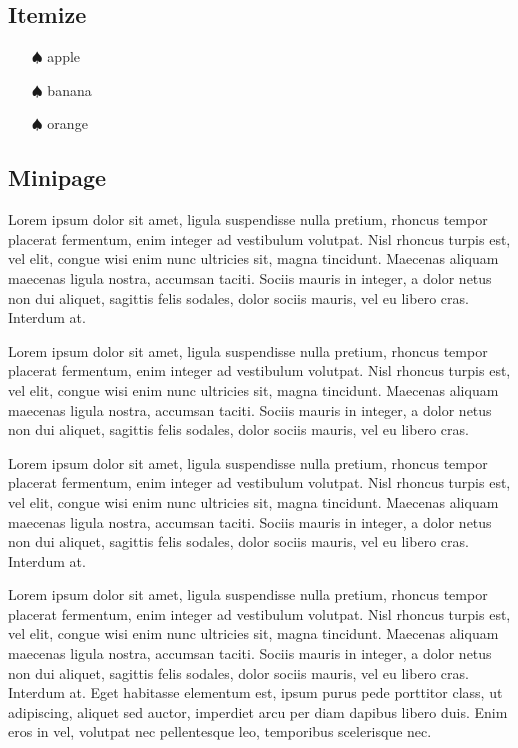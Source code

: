 \documentclass{article}[12pt]
\begin{document}
	\subsection{Itemize}
		\begin{itemize}
			\item[$\spadesuit$] apple
			\item[$\spadesuit$] banana
			\item[$\spadesuit$] orange
		\end{itemize}

	\newpage
	\subsection{Minipage}
		\begin{minipage}{0.3\linewidth}
			Lorem ipsum dolor sit amet, ligula suspendisse nulla pretium, rhoncus tempor placerat fermentum, enim integer ad vestibulum volutpat. Nisl rhoncus turpis est, vel elit, congue wisi enim nunc ultricies sit, magna tincidunt. Maecenas aliquam maecenas ligula nostra, accumsan taciti. Sociis mauris in integer, a dolor netus non dui aliquet, sagittis felis sodales, dolor sociis mauris, vel eu libero cras. Interdum at. 
		\end{minipage}
		\hfill
		\begin{minipage}{0.3\linewidth}
			Lorem ipsum dolor sit amet, ligula suspendisse nulla pretium, rhoncus tempor placerat fermentum, enim integer ad vestibulum volutpat. Nisl rhoncus turpis est, vel elit, congue wisi enim nunc ultricies sit, magna tincidunt. Maecenas aliquam maecenas ligula nostra, accumsan taciti. Sociis mauris in integer, a dolor netus non dui aliquet, sagittis felis sodales, dolor sociis mauris, vel eu libero cras. 
		\end{minipage}
		\hfill
		\begin{minipage}{0.3\linewidth}
			Lorem ipsum dolor sit amet, ligula suspendisse nulla pretium, rhoncus tempor placerat fermentum, enim integer ad vestibulum volutpat. Nisl rhoncus turpis est, vel elit, congue wisi enim nunc ultricies sit, magna tincidunt. Maecenas aliquam maecenas ligula nostra, accumsan taciti. Sociis mauris in integer, a dolor netus non dui aliquet, sagittis felis sodales, dolor sociis mauris, vel eu libero cras. Interdum at. 
		\end{minipage}
		\vfill
		\begin{minipage}{0.3\linewidth}
			Lorem ipsum dolor sit amet, ligula suspendisse nulla pretium, rhoncus tempor placerat fermentum, enim integer ad vestibulum volutpat. Nisl rhoncus turpis est, vel elit, congue wisi enim nunc ultricies sit, magna tincidunt. Maecenas aliquam maecenas ligula nostra, accumsan taciti. Sociis mauris in integer, a dolor netus non dui aliquet, sagittis felis sodales, dolor sociis mauris, vel eu libero cras. Interdum at. Eget habitasse elementum est, ipsum purus pede porttitor class, ut adipiscing, aliquet sed auctor, imperdiet arcu per diam dapibus libero duis. Enim eros in vel, volutpat nec pellentesque leo, temporibus scelerisque nec.
		\end{minipage}
\end{document}
